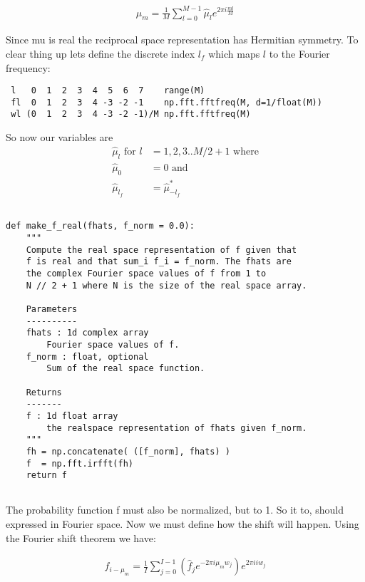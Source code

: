 \documentclass[11pt]{article}
\begin{document}
\begin{align} 
   \mu_m = \frac{1}{M} \sum_{l=0}^{M-1} \hat{\mu}_l e^{2\pi i \frac{m l}{M}}
\end{align}

Since mu is real the reciprocal space representation has Hermitian symmetry. To clear thing up lets define the discrete index $ l_f $ which maps $l$ to the Fourier frequency:

\begin{verbatim}
 l   0  1  2  3  4  5  6  7    range(M)
 fl  0  1  2  3  4 -3 -2 -1    np.fft.fftfreq(M, d=1/float(M))
 wl (0  1  2  3  4 -3 -2 -1)/M np.fft.fftfreq(M)
\end{verbatim}

So now our variables are  
\begin{align}
   \hat{\mu}_l \text{  for } l &= 1, 2, 3 .. M/2 + 1 \text{  where}\\
   \hat{\mu}_0 &= 0 \text{  and} \\
   \hat{\mu}_{l_f} &= \hat{\mu}^*_{-l_f}
\end{align}

\begin{verbatim}

def make_f_real(fhats, f_norm = 0.0):
    """
    Compute the real space representation of f given that 
    f is real and that sum_i f_i = f_norm. The fhats are 
    the complex Fourier space values of f from 1 to 
    N // 2 + 1 where N is the size of the real space array.
    
    Parameters
    ----------
    fhats : 1d complex array
        Fourier space values of f.
    f_norm : float, optional
        Sum of the real space function.
              
    Returns
    -------
    f : 1d float array
        the realspace representation of fhats given f_norm.
    """
    fh = np.concatenate( ([f_norm], fhats) )
    f  = np.fft.irfft(fh)
    return f
    
\end{verbatim}

The probability function f must also be normalized, but to 1. So it to, should expressed in Fourier space. Now we must define how the shift will happen. Using the Fourier shift theorem we have:

\begin{align}
f_{i - \mu_m} = \frac{1}{I} \sum_{j=0}^{I-1} (\hat{f}_j e^{-2\pi i \mu_m w_j}) e^{2\pi i i w_j}
\end{align}
\end{document}
